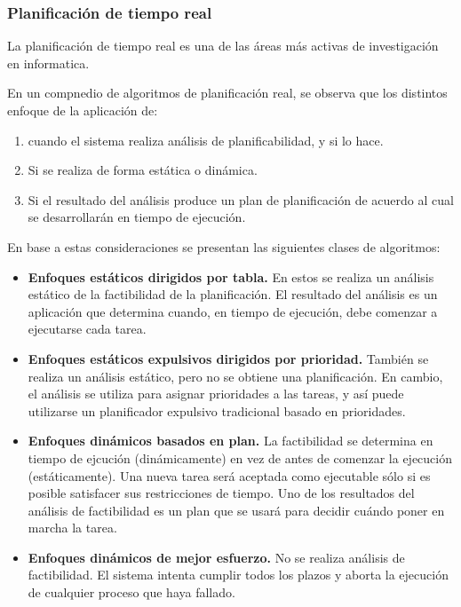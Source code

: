 \documentclass{article}
\begin{document}
			\subsubsection{Planificación de tiempo real}
				La planificación de tiempo real es una de las áreas más activas de investigación en informatica.
				
				En un compnedio de algoritmos de planificación real, se observa que los distintos enfoque de la aplicación de: 
				\begin{enumerate}
				\item cuando el sistema realiza análisis de planificabilidad, y si lo hace.
				\item Si se realiza de forma estática o dinámica.
				\item Si el resultado del análisis produce un plan de planificación de acuerdo al cual se desarrollarán en tiempo de ejecución.
				\end{enumerate}
				
				En base a estas consideraciones se presentan las siguientes clases de algoritmos:
				\begin{itemize}
				\item \textbf{Enfoques estáticos dirigidos por tabla.} En estos se realiza un análisis estático de la factibilidad de la planificación. El resultado del análisis es un aplicación que determina cuando, en tiempo de ejecución, debe comenzar a ejecutarse cada tarea.
				\item \textbf{Enfoques estáticos expulsivos dirigidos por prioridad.} También se realiza un análisis estático, pero no se obtiene una planificación. En cambio, el análisis se utiliza para asignar prioridades a las tareas, y así puede utilizarse un planificador expulsivo tradicional basado en prioridades.
				\item \textbf{Enfoques dinámicos basados en plan.} La factibilidad se determina en tiempo de ejcución (dinámicamente) en vez de antes de comenzar la ejecución (estáticamente). Una nueva tarea será aceptada como ejecutable sólo si es posible satisfacer sus restricciones de tiempo. Uno de los resultados del análisis de factibilidad es un plan que se usará para decidir cuándo poner en marcha la tarea.
				\item \textbf{Enfoques dinámicos de mejor esfuerzo.} No se realiza análisis de factibilidad. El sistema intenta cumplir todos los plazos y aborta la ejecución de cualquier proceso que haya fallado.
				
				\end{itemize}
				
\end{document}
